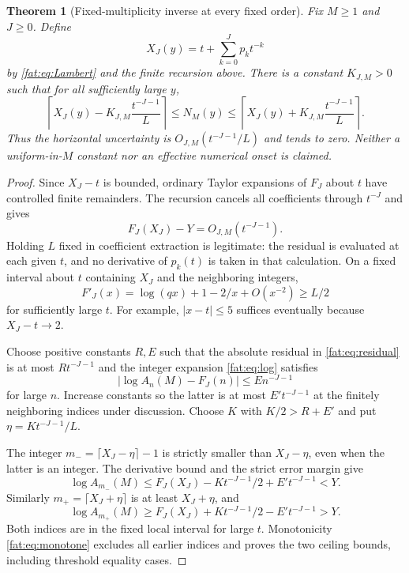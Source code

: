 \documentclass[11pt,letterpaper]{article}
\numberwithin{equation}{section}
\newtheorem{theorem}{Theorem}[section]
\theoremstyle{remark}\newtheorem{remark}[theorem]{Remark}
\begin{document}
\begin{theorem}[Fixed-multiplicity inverse at every fixed order]\label{fat:thm:inverse}
Fix $M\ge1$ and $J\ge0$. Define
\begin{equation}\label{fat:eq:XJ}
 X_J(y)=t+\sum_{k=0}^Jp_kt^{-k}
\end{equation}
by \eqref{fat:eq:Lambert} and the finite recursion above. There is a constant $K_{J,M}>0$ such that for all sufficiently large $y$,
\begin{equation}\label{fat:eq:inverse}
 \left\lceil X_J(y)-K_{J,M}\frac{t^{-J-1}}L\right\rceil
 \le N_M(y)\le
 \left\lceil X_J(y)+K_{J,M}\frac{t^{-J-1}}L\right\rceil.
\end{equation}
Thus the horizontal uncertainty is $O_{J,M}(t^{-J-1}/L)$ and tends to zero. Neither a uniform-in-$M$ constant nor an effective numerical onset is claimed.
\end{theorem}
\begin{proof}
Since $X_J-t$ is bounded, ordinary Taylor expansions of $F_J$ about $t$ have controlled finite remainders. The recursion cancels all coefficients through $t^{-J}$ and gives
\begin{equation}\label{fat:eq:residual}
 F_J(X_J)-Y=O_{J,M}(t^{-J-1}).
\end{equation}
Holding $L$ fixed in coefficient extraction is legitimate: the residual is evaluated at each given $t$, and no derivative of $p_k(t)$ is taken in that calculation. On a fixed interval about $t$ containing $X_J$ and the neighboring integers,
\[
 F'_J(x)=\log(qx)+1-2/x+O(x^{-2})\ge L/2
\]
for sufficiently large $t$. For example, $|x-t|\le5$ suffices eventually because $X_J-t\to2$.

Choose positive constants $R,E$ such that the absolute residual in \eqref{fat:eq:residual} is at most $Rt^{-J-1}$ and the integer expansion \eqref{fat:eq:log} satisfies
\[
 |\log A_n(M)-F_J(n)|\le E n^{-J-1}
\]
for large $n$. Increase constants so the latter is at most $E't^{-J-1}$ at the finitely neighboring indices under discussion. Choose $K$ with $K/2>R+E'$ and put $\eta=Kt^{-J-1}/L$.

The integer $m_- =\lceil X_J-\eta\rceil-1$ is strictly smaller than $X_J-\eta$, even when the latter is an integer. The derivative bound and the strict error margin give
\[
 \log A_{m_-}(M)
 \le F_J(X_J)-K t^{-J-1}/2+E't^{-J-1}<Y.
\]
Similarly $m_+=\lceil X_J+\eta\rceil$ is at least $X_J+\eta$, and
\[
 \log A_{m_+}(M)
 \ge F_J(X_J)+K t^{-J-1}/2-E't^{-J-1}>Y.
\]
Both indices are in the fixed local interval for large $t$. Monotonicity \eqref{fat:eq:monotone} excludes all earlier indices and proves the two ceiling bounds, including threshold equality cases.
\end{proof}
\end{document}
